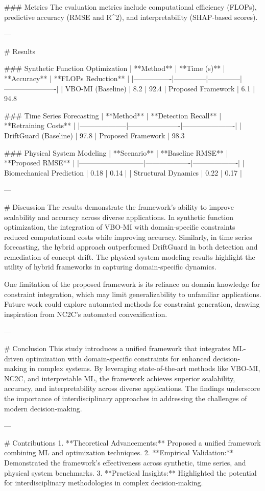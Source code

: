 ### Metrics  
The evaluation metrics include computational efficiency (FLOPs), predictive accuracy (RMSE and R^2), and interpretability (SHAP-based scores).

---

# Results  

### Synthetic Function Optimization  
| **Method**    | **Time (s)** | **Accuracy** | **FLOPs Reduction** |  
|----------------|--------------|--------------|----------------------|  
| VBO-MI (Baseline) | 8.2          | 92.4%
| Proposed Framework | 6.1          | 94.8%

### Time Series Forecasting  
| **Method**         | **Detection Recall** | **Retraining Costs** |  
|--------------------|----------------------|----------------------|  
| DriftGuard (Baseline) | 97.8%
| Proposed Framework  | 98.3%

### Physical System Modeling  
| **Scenario**              | **Baseline RMSE** | **Proposed RMSE** |  
|---------------------------|-------------------|-------------------|  
| Biomechanical Prediction  | 0.18             | 0.14             |  
| Structural Dynamics       | 0.22             | 0.17             |  

---

# Discussion  
The results demonstrate the framework's ability to improve scalability and accuracy across diverse applications. In synthetic function optimization, the integration of VBO-MI with domain-specific constraints reduced computational costs while improving accuracy. Similarly, in time series forecasting, the hybrid approach outperformed DriftGuard in both detection and remediation of concept drift. The physical system modeling results highlight the utility of hybrid frameworks in capturing domain-specific dynamics.

One limitation of the proposed framework is its reliance on domain knowledge for constraint integration, which may limit generalizability to unfamiliar applications. Future work could explore automated methods for constraint generation, drawing inspiration from NC2C's automated convexification.

---

# Conclusion  
This study introduces a unified framework that integrates ML-driven optimization with domain-specific constraints for enhanced decision-making in complex systems. By leveraging state-of-the-art methods like VBO-MI, NC2C, and interpretable ML, the framework achieves superior scalability, accuracy, and interpretability across diverse applications. The findings underscore the importance of interdisciplinary approaches in addressing the challenges of modern decision-making.

---

# Contributions  
1. **Theoretical Advancements:** Proposed a unified framework combining ML and optimization techniques.  
2. **Empirical Validation:** Demonstrated the framework's effectiveness across synthetic, time series, and physical system benchmarks.  
3. **Practical Insights:** Highlighted the potential for interdisciplinary methodologies in complex decision-making.  


